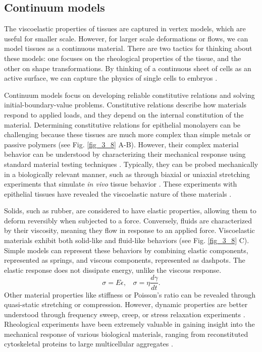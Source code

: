 \hypertarget{continuum-models}{%
	\subsection{Continuum models}\label{continuum-models}}

The viscoelastic properties of tissues are captured in vertex models, which are useful for smaller scale. However, for larger scale deformations or flows, we can model tissues as a continuous material. There are two tactics for thinking about these models: one focuses on the rheological properties of the tissue, and the other on shape transformations. By thinking of a continuous sheet of cells as an active surface, we can capture the physics of single cells to embryos \cite{salbreux2017, khoromskaia2023}.

Continuum models focus on developing reliable constitutive relations and solving initial-boundary-value problems. Constitutive relations describe how materials respond to applied loads, and they depend on the internal constitution of the material. Determining constitutive relations for epithelial monolayers can be challenging because these tissues are much more complex than simple metals or passive polymers (see Fig. \ref{fig_3_8} A-B). However, their complex material behavior can be understood by characterizing their mechanical response using standard material testing techniques \cite{humphrey2002}. Typically, they can be probed mechanically in a biologically relevant manner, such as through biaxial or uniaxial stretching experiments that simulate \textit{in vivo} tissue behavior \cite{humphrey2014}. These experiments with epithelial tissues have revealed the viscoelastic nature of these materials \cite{harris2012, khalilgharibi2019}.

Solids, such as rubber, are considered to have elastic properties, allowing them to deform reversibly when subjected to a force. Conversely, fluids are characterized by their viscosity, meaning they flow in response to an applied force. Viscoelastic materials exhibit both solid-like and fluid-like behaviors (see Fig. \ref{fig_3_8} C). Simple models can represent these behaviors by combining elastic components, represented as springs, and viscous components, represented as dashpots. The elastic response does not dissipate energy, unlike the viscous response. $$ \sigma = E\epsilon ,\ \ \ \ \sigma = \eta \frac{d\gamma}{dt}. $$ Other material properties like stiffness or Poisson's ratio can be revealed through quasi-static stretching or compression. However, dynamic properties are better understood through frequency sweep, creep, or stress relaxation experiments \cite{guimaraes2020}. Rheological experiments have been extremely valuable in gaining insight into the mechanical response of various biological materials, ranging from reconstituted cytoskeletal proteins to large multicellular aggregates \cite{mofrad2009, cavanaugh2020, xi2018}.

